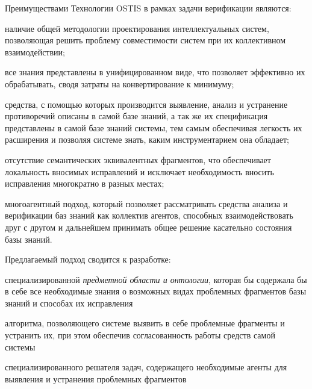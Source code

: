 Преимуществами Технологии OSTIS в рамках задачи верификации являются:
\begin{textitemize}
    \item наличие общей методологии проектирования интеллектуальных систем, позволяющая решить проблему совместимости систем при их коллективном взаимодействии;
    \item все знания представлены в унифицированном виде, что позволяет эффективно их обрабатывать, сводя затраты на конвертирование к минимуму;
   \item средства, с помощью которых производится выявление, анализ и устранение противоречий описаны в самой базе знаний, а так же их спецификация представлены в самой базе знаний системы, тем самым обеспечивая легкость их расширения и позволяя системе знать, каким инструментарием она обладает;
   \item отсутствие семантических эквивалентных фрагментов, что обеспечивает локальность вносимых исправлений и исключает необходимость вносить исправления многократно в разных местах;
   \item многоагентный подход, который позволяет рассматривать средства анализа и верификации баз знаний как коллектив агентов, способных взаимодействовать друг с другом и дальнейшем принимать общее решение касательно состояния базы знаний. 
\end{textitemize}

Предлагаемый подход сводится к разработке:
\begin{textitemize}
    \item специализированной \textit{предметной области и онтологии}, которая бы содержала бы в себе все необходимые знания о возможных видах проблемных фрагментов базы знаний и способах их исправления
    \item алгоритма, позволяющего системе выявить в себе проблемные фрагменты и устранить их, при этом обеспечив согласованность работы средств самой системы
    \item специализированного решателя задач, содержащего необходимые агенты для выявления и устранения проблемных фрагментов
\end{textitemize}

